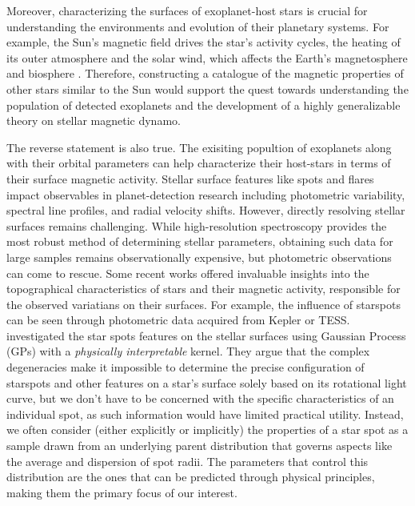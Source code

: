 \documentclass[twocolumn]{aastex631}
\begin{document}
Moreover, characterizing the surfaces of exoplanet-host stars is crucial for understanding the environments and evolution of their planetary 
systems. For example, the Sun's magnetic field drives the star's activity cycles, the heating of its outer atmosphere and the solar wind,
which affects the Earth's magnetosphere and biosphere \citep{Babcock1961,Charbonneau2014}. 
Therefore, constructing a catalogue of the magnetic properties of other stars similar to the Sun would support the quest towards understanding 
the population of detected exoplanets and the development of a highly generalizable theory on stellar magnetic dynamo.

The reverse statement is also true. The exisiting popultion of exoplanets along with their orbital parameters can help characterize their host-stars
in terms of their surface magnetic activity. Stellar surface features like spots and flares impact observables in planet-detection research including photometric 
variability, spectral line profiles, and radial velocity shifts. However, directly resolving stellar surfaces remains challenging. 
While high-resolution spectroscopy provides the most robust method of determining stellar parameters, obtaining such data for large samples remains 
observationally expensive, but photometric observations can come to rescue. Some recent works offered invaluable insights into the topographical 
characteristics of stars and their magnetic activity, responsible for the observed variatians on their surfaces. For example, the influence of starspots 
can be seen through photometric data acquired from Kepler or TESS. \cite{Luger2021b} investigated the star spots features on the stellar surfaces using 
Gaussian Process (GPs) with a \emph{physically interpretable} kernel. They argue that the complex degeneracies make it impossible to determine the 
precise configuration of starspots and other features on a star's surface solely based on its rotational light curve, but we don't have to be 
concerned with the specific characteristics of an individual spot, as such information would have limited practical utility. Instead, we often consider 
(either explicitly or implicitly) the properties of a star spot as a sample drawn from an underlying parent distribution that governs aspects like the average 
and dispersion of spot radii. The parameters that control this distribution are the ones that can be predicted through physical principles, 
making them the primary focus of our interest. 
\end{document}
